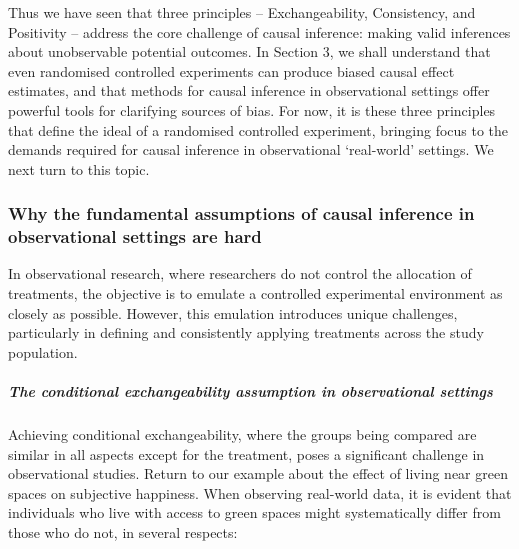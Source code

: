 \documentclass[
  singlecolumn]{article}
\let\oldsubparagraph\subparagraph
\renewcommand{\subparagraph}[1]{\oldsubparagraph{#1}\mbox{}}
\begin{document}
Thus we have seen that three principles -- Exchangeability, Consistency,
and Positivity -- address the core challenge of causal inference: making
valid inferences about unobservable potential outcomes. In Section 3, we
shall understand that even randomised controlled experiments can produce
biased causal effect estimates, and that methods for causal inference in
observational settings offer powerful tools for clarifying sources of
bias. For now, it is these three principles that define the ideal of a
randomised controlled experiment, bringing focus to the demands required
for causal inference in observational `real-world' settings. We next
turn to this topic.

\subsubsection{Why the fundamental assumptions of causal inference in
observational settings are
hard}\label{why-the-fundamental-assumptions-of-causal-inference-in-observational-settings-are-hard}

In observational research, where researchers do not control the
allocation of treatments, the objective is to emulate a controlled
experimental environment as closely as possible. However, this emulation
introduces unique challenges, particularly in defining and consistently
applying treatments across the study population.

\subparagraph{The conditional exchangeability assumption in
observational
settings}\label{the-conditional-exchangeability-assumption-in-observational-settings}

Achieving conditional exchangeability, where the groups being compared
are similar in all aspects except for the treatment, poses a significant
challenge in observational studies. Return to our example about the
effect of living near green spaces on subjective happiness. When
observing real-world data, it is evident that individuals who live with
access to green spaces might systematically differ from those who do
not, in several respects:
\end{document}
